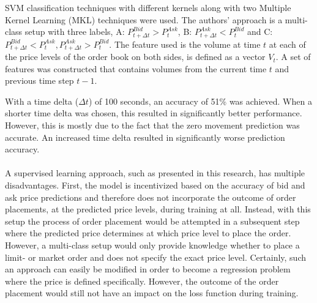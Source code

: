 SVM classification techniques with different kernels along with two Multiple Kernel Learning (MKL) techniques were used.
The authors' approach is a multi-class setup with three labels, A: $P_{t+\Delta{t}}^{Bid} > P_t^{Ask}$, B: $P_{t+\Delta{t}}^{Ask} < P_t^{Bid}$ and C: $P_{t+\Delta{t}}^{Bid} < P_t^{Ask}, P_{t+\Delta{t}}^{Ask} > P_t^{Bid}$.
The feature used is the volume at time $t$ at each of the price levels of the order book on both sides, is defined as a vector $V_t$.
A set of features was constructed that contains volumes from the current time $t$ and previous time step $t-1$.

With a time delta ($\Delta{t}$) of 100 seconds, an accuracy of 51\% was achieved.
When a shorter time delta was chosen, this resulted in significantly better performance. However, this is mostly due to the fact that the zero movement prediction was accurate.
An increased time delta resulted in significantly worse prediction accuracy.
\\
\\
A supervised learning approach, such as presented in this research, has multiple disadvantages.
First, the model is incentivized based on the accuracy of bid and ask price predictions and therefore does not incorporate the outcome of order placements, at the predicted price levels, during training at all.
Instead, with this setup the process of order placement would be attempted in a subsequent step where the predicted price determines at which price level to place the order.
However, a multi-class setup would only provide knowledge whether to place a limit- or market order and does not specify the exact price level.
Certainly, such an approach can easily be modified in order to become a regression problem where the price is defined specifically.
However, the outcome of the order placement would still not have an impact on the loss function during training.

